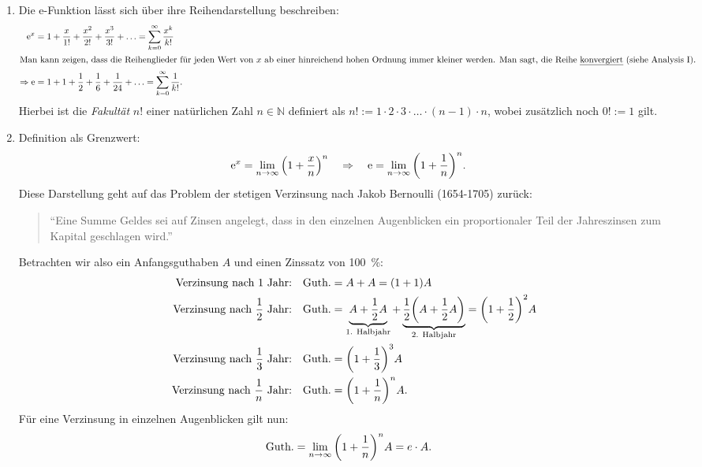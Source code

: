 \begin{enumerate}
    \item Die e-Funktion lässt sich über ihre Reihendarstellung beschreiben:
    \begin{align}
        \mathrm{e}^{x} &= 1 + \frac{x}{1!} + \frac{x^2}{2!} + \frac{x^3}{3!} + \hdots = \sum_{k=0}^\infty \frac{x^k}{k!} \notag \\
        \intertext{Man kann zeigen, dass die Reihenglieder für jeden Wert von $x$ ab einer hinreichend hohen Ordnung immer kleiner werden. Man sagt, die Reihe \emph{konvergiert} (siehe Analysis I).}
        \Rightarrow \mathrm{e} &= 1 + 1 + \frac{1}{2} + \frac{1}{6} + \frac{1}{24} + \hdots = \sum_{k=0}^\infty \frac{1}{k!}.    
    \end{align}
    Hierbei ist die \emph{Fakultät} $n!$ einer natürlichen Zahl $n \in \mathbb{N}$ definiert als $n! := 1\cdot 2\cdot 3 \cdot \hdots \cdot (n-1)\cdot n$, wobei zusätzlich noch $0! := 1$ gilt.
    \item Definition als Grenzwert: 
    \begin{align}
        \mathrm{e}^x = \lim_{n\to \infty} \qty(1+\frac{x}{n})^n  \quad \Rightarrow \quad \mathrm{e} = \lim_{n\to \infty} \qty(1+\frac{1}{n})^n.
    \end{align}
    Diese Darstellung geht auf das Problem der stetigen Verzinsung nach Jakob Bernoulli (1654-1705) zurück: 
    \begin{quote}
        ``Eine Summe Geldes sei auf Zinsen angelegt, dass in den einzelnen Augenblicken ein proportionaler Teil der Jahreszinsen zum Kapital geschlagen wird.''
    \end{quote}
    Betrachten wir also ein Anfangsguthaben $A$ und einen Zinssatz von \SI{100}{\percent}: 
    \begin{align}
        \qq{Verzinsung nach 1 Jahr:} \text{Guth.} &= A + A = (1+1) A \notag \\
        \qq{Verzinsung nach $\frac{1}{2}$ Jahr:} \text{Guth.} &= \underbrace{A + \frac{1}{2} A}_{\text{1. Halbjahr}}  + \underbrace{\frac{1}{2}\qty( A + \frac{1}{2} A)}_{\text{2. Halbjahr}} = \qty(1+\frac{1}{2})^2 A \notag \\
        \qq{Verzinsung nach $\frac{1}{3}$ Jahr:} \text{Guth.} &= \qty(1+\frac{1}{3})^3 A \notag \\
        \qq{Verzinsung nach $\frac{1}{n}$ Jahr:} \text{Guth.} &= \qty(1+\frac{1}{n})^n A.
    \end{align}
    Für eine Verzinsung in einzelnen Augenblicken gilt nun: 
    \begin{align}
        \text{Guth.} = \lim_{n\to\infty} \qty(1+\frac{1}{n})^n A = e\cdot A.
    \end{align}
\end{enumerate}